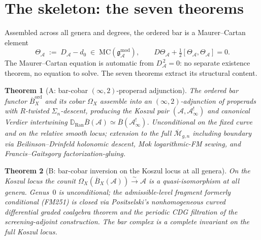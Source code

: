 \documentclass[11pt]{article}
\providecommand{\cA}{\mathcal{A}}
\providecommand{\cM}{\mathcal{M}}
\providecommand{\barB}{\overline{B}}
\providecommand{\MC}{\mathrm{MC}}
\providecommand{\Ran}{\operatorname{Ran}}
\providecommand{\gAmod}{\mathfrak{g}_{\cA}^{\mathrm{mod}}}
\newtheorem{theorem}{Theorem}[section]
\begin{document}
\section{The skeleton: the seven theorems}

\noindent
Assembled across all genera and degrees, the ordered bar is a
Maurer--Cartan element
\begin{equation}\label{eq:worldview-MC}
\Theta_\cA \;:=\; D_\cA - d_0 \;\in\; \MC(\gAmod),
\qquad D\Theta_\cA + \tfrac{1}{2}[\Theta_\cA,\Theta_\cA] = 0.
\end{equation}
The Maurer--Cartan equation is automatic from $D_\cA^{\,2}=0$: no
separate existence theorem, no equation to solve. The seven theorems
extract its structural content.

\begin{theorem}[A: bar-cobar $(\infty,2)$-properad adjunction]
The ordered bar functor $\barB^{\mathrm{ord}}_X$ and its cobar
$\Omega_X$ assemble into an $(\infty,2)$-adjunction of properads with
$R$-twisted $\Sigma_n$-descent, producing the Koszul pair
$(\cA,\cA^{!}_\infty)$ and canonical Verdier intertwining
$\mathbb{D}_{\Ran}\barB(\cA)\simeq\barB(\cA^{!}_\infty)$.
Unconditional on the fixed curve and on the relative smooth locus;
extension to the full $\overline{\cM}_{g,n}$ including boundary
via Beilinson--Drinfeld holonomic descent, Mok logarithmic-FM
sewing, and Francis--Gaitsgory factorization-gluing.
\end{theorem}

\begin{theorem}[B: bar-cobar inversion on the Koszul locus at all genera]
On the Koszul locus the counit
$\Omega_X(\barB_X(\cA))\xrightarrow{\sim}\cA$ is a quasi-isomorphism
at all genera. Genus~$0$ is unconditional; the admissible-level
fragment formerly conditional (FM251) is closed via Positselski's
nonhomogeneous curved differential graded coalgebra theorem and the
periodic CDG filtration of the screening-adjoint construction.
The bar complex is a complete invariant on the full Koszul locus.
\end{theorem}
\end{document}
